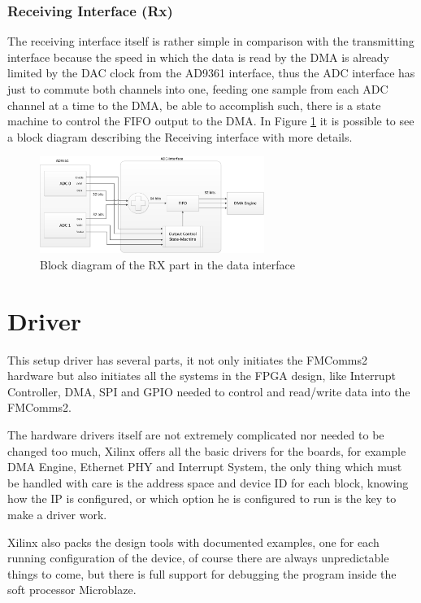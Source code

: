 \subsubsection{Receiving Interface (Rx)}

 The receiving interface itself is rather simple in comparison with the
transmitting interface because the speed in which the data is read by the DMA
is already limited by the DAC clock from the AD9361 interface, thus the ADC
interface has just to commute both channels into one, feeding one sample from
each ADC channel at a time to the DMA, be able to accomplish such, there is a
state machine to control the FIFO output to the DMA. In Figure
\ref{fig:dataifrx} it is possible to see a block diagram describing the
Receiving interface with more details.

\begin{figure}[htbp]
    \centering
    \includegraphics[width=0.65\textwidth]{./figures/rxdata_if}
    \caption{ Block diagram of the RX part in the data interface
    \label{fig:dataifrx}}
\end{figure}

\section{Driver}
\label{impl:driver}

This setup driver has several parts, it not only initiates the FMComms2 hardware
but also initiates all the systems in the FPGA design, like Interrupt Controller,
 DMA, SPI and GPIO needed to control and read/write data into the FMComms2.

The hardware drivers itself are not extremely complicated nor needed to be changed
too much, Xilinx offers all the basic drivers for the boards, for example DMA Engine,
Ethernet PHY and Interrupt System, the only thing which must be handled with care is
the address space and device ID for each block, knowing how the IP is configured,
or which option he is configured to run is the key to make a driver work.

Xilinx also packs the design tools with documented examples, one for each running
configuration of the device, of course there are always unpredictable things to come,
but there is full support for debugging the program inside the soft processor
Microblaze.

